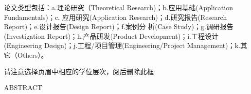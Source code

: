\documentclass[UTF8, scheme=chinese, openany, oneside]{ctexbook}
\renewcommand{\headrulewidth}{0.4pt}
\renewcommand{\headrulewidth}{0.4pt}
\renewcommand{\headrulewidth}{0.4pt}
\renewcommand{\headrulewidth}{0.4pt}
\renewcommand{\headrulewidth}{0.4pt}
\renewcommand{\headrulewidth}{0.4pt}
\renewcommand{\headrulewidth}{0.6pt}
\renewcommand{\headrulewidth}{0.6pt}
\begin{document}
\vspace{0.8cm}


\vspace{0.3cm}
{ \noindent 论文类型包括：a.理论研究（Theoretical Research)；b.应用基础(Application Fundamentals)；c. 应用研究(Application Research)；d.研究报告(Research Report)；e.设计报告(Design Report)；f.案例分
析(Case Study)；g.调研报告(Investigation Report)；h.产品研发(Product Development)；i.工程设计
(Engineering Design)；j.工程/项目管理(Engineering/Project Management)；k.其它（Others）。}



\clearpage
{} %
\setcounter{page}{2}  %

\pagestyle{fancy}
\fancyhf{}
\renewcommand{\headrulewidth}{0.75pt} %

\begin{center}
    \begin{tcolorbox}[
        colback=white, 
        colframe=blue, 
        boxrule=1.5pt, 
        sharp corners, 
        width=0.85\textwidth,
        center,
        halign=center,
        top=2mm, bottom=2mm
    ]
        {\rmfamily{} 请注意选择页眉中相应的学位层次，阅后{\color{red}删除此框}}
    \end{tcolorbox}
\end{center}

\vspace{0.5cm}
\begin{center}
    { ABSTRACT}
\end{center}
\vspace{0.5cm}




\end{document}

